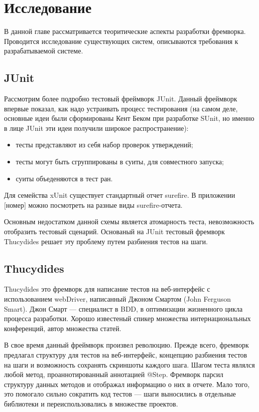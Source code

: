 \chapter{Исследование}
\label{chapter2}

В данной главе рассматривается теоритические аспекты разработки фремворка. Проводится исследование существующих систем, описываются требования к разрабатываемой системе.

\section{JUnit}

Рассмотрим более подробно тестовый фреймворк JUnit. Данный фреймворк впервые показал, как надо устраивать процесс тестирования (на самом деле, основные идеи были сформированы Кент Беком при разработке SUnit, но именно в лице JUnit эти идеи получили широкое распространение):

\begin{itemize}
\item тесты представляют из себя набор проверок утверждений;
\item тесты могут быть сгруппированы в суиты, для совместного запуска;
\item суиты объеденяются в тест ран.
\end{itemize}

Для семейства xUnit существует стандартный отчет surefire. В приложении [номер] можно посмотреть на разные виды surefire-отчета.

Основным недостатком данной схемы является атомарность теста, невозможность отобразить тестовый сценарий. Основаный на JUnit тестовый фремворк Thucydides решает эту проблему путем разбиения тестов на шаги.

\section{Thucydides}
Thucydides это фремворк для написание тестов на веб-интерфейс с использованием webDriver, написанный Джоном Смартом (John Ferguson Smart). Джон Смарт --- специалист в BDD, в оптимизации жизненного цикла процесса разработки. Хорошо известеный спикер множества интернациональных конференций, автор множества статей.

В свое время данный фреймворк произвел революцию. Прежде всего, фремворк предлагал структуру для тестов на веб-интерфейс, концепцию разбиения тестов на шаги и возможность сохранять скриншоты каждого шага. Шагом теста являлся любой метод, проаннотированный аннотацией @Step.
Фремворк парсил структуру данных методов и отображал информацию о них в отчете. Мало того, это помогало сильно сократить код тестов --- шаги выносились в отдельные библиотеки и переиспользовались в множестве проектов.

